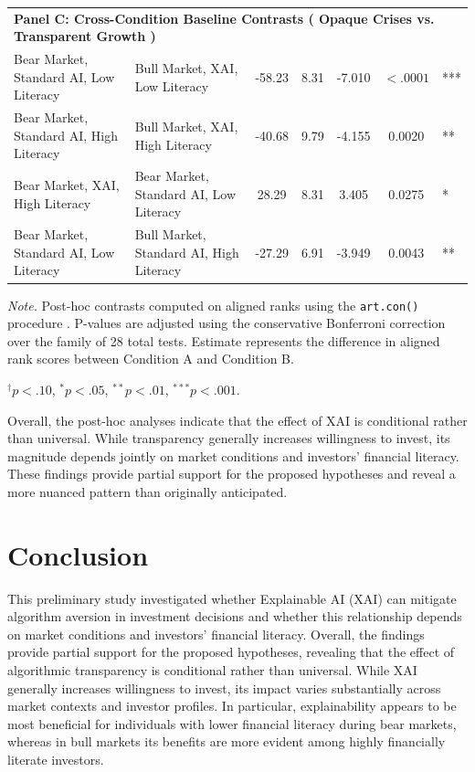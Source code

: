 \documentclass[10pt, a4paper]{article} %
\begin{document}
\begin{table}
\begin{threeparttable}
\begin{tabular}{llccccl}
\midrule
\multicolumn{7}{l}{\textbf{Panel C: Cross-Condition Baseline Contrasts ( Opaque Crises vs. Transparent Growth )}} \\
Bear Market, Standard AI, Low Literacy  & Bull Market, XAI, Low Literacy  & -58.23 & 8.31 & -7.010 & $<.0001$ & *** \\
Bear Market, Standard AI, High Literacy & Bull Market, XAI, High Literacy & -40.68 & 9.79 & -4.155 & 0.0020 & ** \\
Bear Market, XAI, High Literacy         & Bear Market, Standard AI, Low Literacy  & 28.29 & 8.31 & 3.405 & 0.0275 & * \\
Bear Market, Standard AI, Low Literacy  & Bull Market, Standard AI, High Literacy & -27.29 & 6.91 & -3.949 & 0.0043 & ** \\
\bottomrule
\end{tabular}

\begin{tablenotes}
\footnotesize
\item \textit{Note.} Post-hoc contrasts computed on aligned ranks using the \texttt{art.con()} procedure \citep{wobbrock2011thealigned}. P-values are adjusted using the conservative Bonferroni correction over the family of 28 total tests. Estimate represents the difference in aligned rank scores between Condition A and Condition B.
\item $^{\dagger}p<.10$, $^{*}p<.05$, $^{**}p<.01$, $^{***}p<.001$.
\end{tablenotes}
\end{threeparttable}
\end{table}

\clearpage

Overall, the post-hoc analyses indicate that the effect of XAI is conditional rather than universal. While transparency generally increases willingness to invest, its magnitude depends jointly on market conditions and investors' financial literacy. These findings provide partial support for the proposed hypotheses and reveal a more nuanced pattern than originally anticipated.

\section{Conclusion}

This preliminary study investigated whether Explainable AI (XAI) can mitigate algorithm aversion in investment decisions and whether this relationship depends on market conditions and investors' financial literacy. Overall, the findings provide partial support for the proposed hypotheses, revealing that the effect of algorithmic transparency is conditional rather than universal. While XAI generally increases willingness to invest, its impact varies substantially across market contexts and investor profiles. In particular, explainability appears to be most beneficial for individuals with lower financial literacy during bear markets, whereas in bull markets its benefits are more evident among highly financially literate investors.
\end{document}
